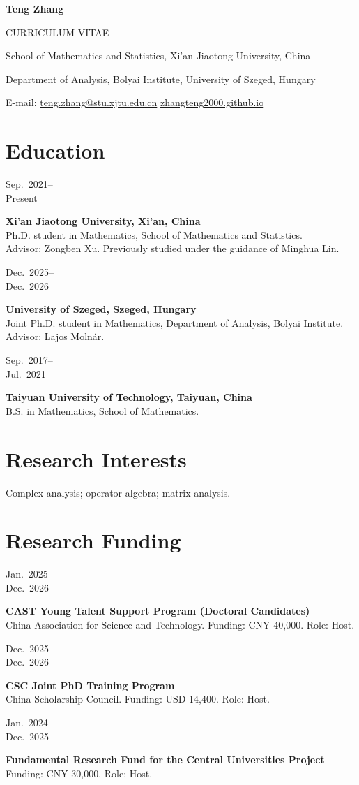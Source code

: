 \documentclass[11pt,letterpaper]{article}
\newcommand{\entry}[3]{\Needspace{3\baselineskip}\noindent\begin{minipage}[t]{1.14in}\vspace{0pt}\small\sffamily\color{muted}\raggedright #2\end{minipage}\hfill\begin{minipage}[t]{\dimexpr\textwidth-1.26in\relax}\vspace{0pt}\raggedright\setlength{\parskip}{0pt}\textbf{#1}\\#3\end{minipage}\par\vspace{3pt}}
\let\originalsection\section
\renewcommand{\section}[1]{\Needspace{7\baselineskip}\originalsection{#1}}
\begin{document}
\thispagestyle{fancy}
\fancyhead{}%
{\LARGE\bfseries\color{inkblue} Teng Zhang}\par
{\small\sffamily\color{muted}CURRICULUM VITAE}\par
\vspace{5pt}
School of Mathematics and Statistics, Xi'an Jiaotong University, China\par
Department of Analysis, Bolyai Institute, University of Szeged, Hungary\par
E-mail: \href{mailto:teng.zhang@stu.xjtu.edu.cn}{teng.zhang@stu.xjtu.edu.cn}\quad
\href{https://zhangteng2000.github.io}{zhangteng2000.github.io}\par

\section{Education}
\entry{Xi'an Jiaotong University, Xi'an, China}{Sep.~2021--\\Present}{%
Ph.D. student in Mathematics, School of Mathematics and Statistics.\\
Advisor: Zongben Xu. Previously studied under the guidance of Minghua Lin.}
\entry{University of Szeged, Szeged, Hungary}{Dec.~2025--\\Dec.~2026}{%
Joint Ph.D. student in Mathematics, Department of Analysis, Bolyai Institute.\\
Advisor: Lajos Moln\'ar.}
\entry{Taiyuan University of Technology, Taiyuan, China}{Sep.~2017--\\Jul.~2021}{%
B.S. in Mathematics, School of Mathematics.}

\section{Research Interests}
Complex analysis; operator algebra; matrix analysis.

\section{Research Funding}
\entry{CAST Young Talent Support Program (Doctoral Candidates)}{Jan.~2025--\\Dec.~2026}{%
China Association for Science and Technology. Funding: CNY 40,000. Role: Host.}
\entry{CSC Joint PhD Training Program}{Dec.~2025--\\Dec.~2026}{%
China Scholarship Council. Funding: USD 14,400. Role: Host.}
\entry{Fundamental Research Fund for the Central Universities Project}{Jan.~2024--\\Dec.~2025}{%
Funding: CNY 30,000. Role: Host.}
\end{document}
